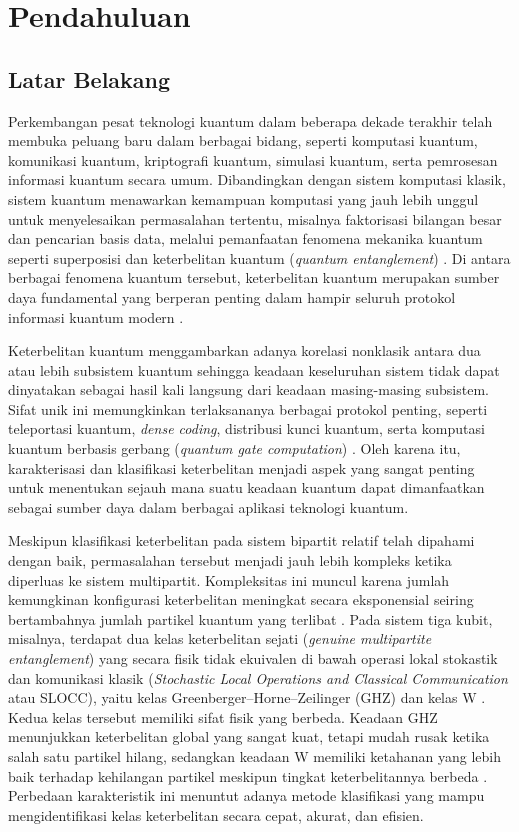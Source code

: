 \chapter{Pendahuluan}
\section{Latar Belakang}
\par
Perkembangan pesat teknologi kuantum dalam beberapa dekade terakhir telah membuka peluang baru dalam berbagai bidang, seperti komputasi kuantum, komunikasi kuantum, kriptografi kuantum, simulasi kuantum, serta pemrosesan informasi kuantum secara umum. Dibandingkan dengan sistem komputasi klasik, sistem kuantum menawarkan kemampuan komputasi yang jauh lebih unggul untuk menyelesaikan permasalahan tertentu, misalnya faktorisasi bilangan besar dan pencarian basis data, melalui pemanfaatan fenomena mekanika kuantum seperti superposisi dan keterbelitan kuantum (\textit{quantum entanglement}) \cite{nielsen2010quantum}. Di antara berbagai fenomena kuantum tersebut, keterbelitan kuantum merupakan sumber daya fundamental yang berperan penting dalam hampir seluruh protokol informasi kuantum modern \cite{horodecki2009quantum}.
\par
Keterbelitan kuantum menggambarkan adanya korelasi nonklasik antara dua atau lebih subsistem kuantum sehingga keadaan keseluruhan sistem tidak dapat dinyatakan sebagai hasil kali langsung dari keadaan masing-masing subsistem. Sifat unik ini memungkinkan terlaksananya berbagai protokol penting, seperti teleportasi kuantum, \textit{dense coding}, distribusi kunci kuantum, serta komputasi kuantum berbasis gerbang (\textit{quantum gate computation}) \cite{bennett_1993,Bennett1992}. Oleh karena itu, karakterisasi dan klasifikasi keterbelitan menjadi aspek yang sangat penting untuk menentukan sejauh mana suatu keadaan kuantum dapat dimanfaatkan sebagai sumber daya dalam berbagai aplikasi teknologi kuantum.
\par
Meskipun klasifikasi keterbelitan pada sistem bipartit relatif telah dipahami dengan baik, permasalahan tersebut menjadi jauh lebih kompleks ketika diperluas ke sistem multipartit. Kompleksitas ini muncul karena jumlah kemungkinan konfigurasi keterbelitan meningkat secara eksponensial seiring bertambahnya jumlah partikel kuantum yang terlibat \cite{horodecki2009quantum}. Pada sistem tiga kubit, misalnya, terdapat dua kelas keterbelitan sejati (\textit{genuine multipartite entanglement}) yang secara fisik tidak ekuivalen di bawah operasi lokal stokastik dan komunikasi klasik (\textit{Stochastic Local Operations and Classical Communication} atau SLOCC), yaitu kelas Greenberger--Horne--Zeilinger (GHZ) dan kelas W \cite{dur2000three}. Kedua kelas tersebut memiliki sifat fisik yang berbeda. Keadaan GHZ menunjukkan keterbelitan global yang sangat kuat, tetapi mudah rusak ketika salah satu partikel hilang, sedangkan keadaan W memiliki ketahanan yang lebih baik terhadap kehilangan partikel meskipun tingkat keterbelitannya berbeda \cite{dur2000three}. Perbedaan karakteristik ini menuntut adanya metode klasifikasi yang mampu mengidentifikasi kelas keterbelitan secara cepat, akurat, dan efisien.
